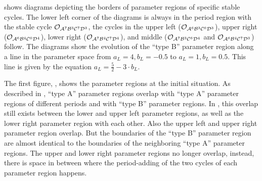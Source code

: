  shows diagrams depicting the borders of parameter regions of specific stable cycles.
The lower left corner of the diagrams is always in the period region with the stable cycle $\mathcal{O}_{\mathcal{A}^7\mathcal{B}^3\mathcal{C}^7\mathcal{D}^3}$, the cycles in the upper left ($\mathcal{O}_{\mathcal{A}^6\mathcal{B}^3\mathcal{C}^6\mathcal{D}^3}$), upper right ($\mathcal{O}_{\mathcal{A}^6\mathcal{B}^4\mathcal{C}^6\mathcal{D}^4}$), lower right ($\mathcal{O}_{\mathcal{A}^7\mathcal{B}^4\mathcal{C}^7\mathcal{D}^4}$), and middle ($\mathcal{O}_{\mathcal{A}^7\mathcal{B}^3\mathcal{C}^6\mathcal{D}^4}$ and $\mathcal{O}_{\mathcal{A}^6\mathcal{B}^4\mathcal{C}^7\mathcal{D}^3}$) follow.
The diagrams show the evolution of the ``type B'' parameter region along a line in the parameter space from $a_L = 4, b_L = -0.5$ to $a_L = 1, b_L = 0.5$.
This line is given by the equation $a_L = \frac{5}{2} - 3 \cdot b_L$.

The first figure, , shows the parameter regions at the initial situation.
As described in , ``type A'' parameter regions overlap with ``type A'' parameter regions of different periods and with ``type B'' parameter regions.
In , this overlap still exists between the lower and upper left parameter regions, as well as the lower right parameter region with each other.
Also the upper left and upper right parameter region overlap.
But the boundaries of the ``type B'' parameter region are almost identical to the boundaries of the neighboring ``type A'' parameter regions.
The upper and lower right parameter regions no longer overlap, instead, there is space in between where the period-adding of the two cycles of each parameter region happens.


\begin{figure}
    \centering
     \\
    \caption{}
    \label{fig:minrep.path.to.disappearance}
\end{figure}
